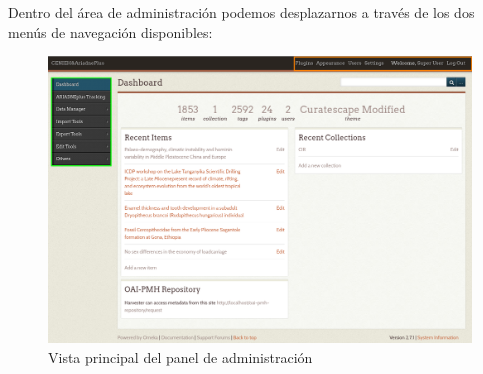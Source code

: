 \documentclass[
]{article}
\begin{document}
Dentro del área de administración podemos desplazarnos a través de los
dos menús de navegación disponibles:

\begin{figure}
\hypertarget{admin-view}{%
\centering
\includegraphics{../_static/images/admin-view.png}
\caption{Vista principal del panel de administración}\label{admin-view}
}
\end{figure}
\end{document}
